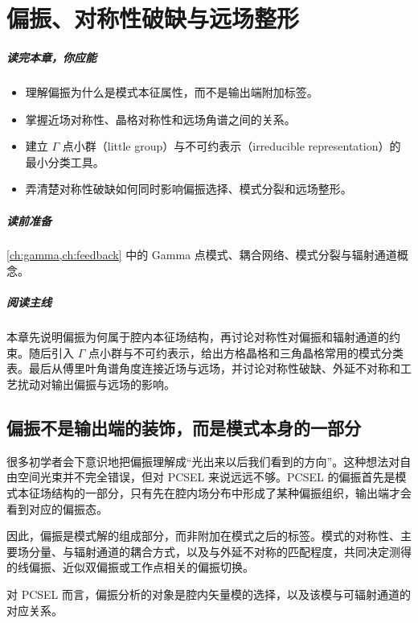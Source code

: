 \chapter{偏振、对称性破缺与远场整形}
\label{ch:polarization}

\paragraph{读完本章，你应能}
\begin{itemize}
  \item 理解偏振为什么是模式本征属性，而不是输出端附加标签。
  \item 掌握近场对称性、晶格对称性和远场角谱之间的关系。
  \item 建立 $\Gamma$ 点小群（little group）与不可约表示（irreducible representation）的最小分类工具。
  \item 弄清楚对称性破缺如何同时影响偏振选择、模式分裂和远场整形。
\end{itemize}

\paragraph{读前准备}
\cref{ch:gamma,ch:feedback} 中的 Gamma 点模式、耦合网络、模式分裂与辐射通道概念。

\paragraph{阅读主线}
本章先说明偏振为何属于腔内本征场结构，再讨论对称性对偏振和辐射通道的约束。随后引入 $\Gamma$ 点小群与不可约表示，给出方格晶格和三角晶格常用的模式分类表。最后从傅里叶角谱角度连接近场与远场，并讨论对称性破缺、外延不对称和工艺扰动对输出偏振与远场的影响。

\section{偏振不是输出端的装饰，而是模式本身的一部分}
很多初学者会下意识地把偏振理解成“光出来以后我们看到的方向”。这种想法对自由空间光束并不完全错误，但对 PCSEL 来说远远不够。PCSEL 的偏振首先是模式本征场结构的一部分，只有先在腔内场分布中形成了某种偏振组织，输出端才会看到对应的偏振态。

因此，偏振是模式解的组成部分，而非附加在模式之后的标签。模式的对称性、主要场分量、与辐射通道的耦合方式，以及与外延不对称的匹配程度，共同决定测得的线偏振、近似双偏振或工作点相关的偏振切换。

\begin{IntuitionBox}
对 PCSEL 而言，偏振分析的对象是腔内矢量模的选择，以及该模与可辐射通道的对应关系。
\end{IntuitionBox}

